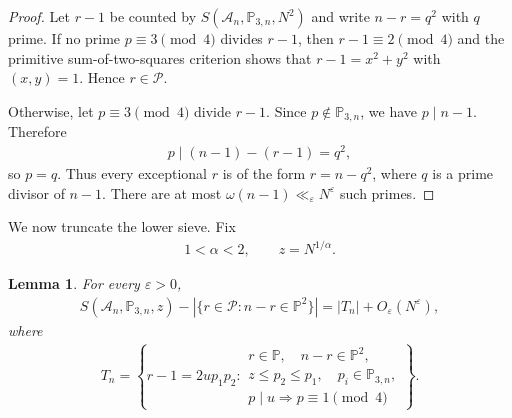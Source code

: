\documentclass[12pt,reqno]{amsart}
\numberwithin{equation}{section}
\newtheorem{lemma}[equation]{Lemma}
\theoremstyle{definition}
\theoremstyle{remark}
\begin{document}
\begin{proof}
Let $r-1$ be counted by $S(\mathcal A_n,\mathbb P_{3,n},N^2)$ and write
$n-r=q^2$ with $q$ prime. If no prime $p\equiv3\pmod4$ divides $r-1$,
then $r-1\equiv2\pmod4$ and the primitive sum-of-two-squares criterion
shows that $r-1=x^2+y^2$ with $(x,y)=1$. Hence $r\in\mathcal P$.

Otherwise, let $p\equiv3\pmod4$ divide $r-1$. Since $p\notin\mathbb
P_{3,n}$, we have $p\mid n-1$. Therefore
\begin{align*}
 p\mid(n-1)-(r-1)=q^2,
\end{align*}
so $p=q$. Thus every exceptional $r$ is of the form $r=n-q^2$, where
$q$ is a prime divisor of $n-1$. There are at most
$\omega(n-1)\ll_\varepsilon N^\varepsilon$ such primes.
\end{proof}
We now truncate the lower sieve. Fix
\begin{align}\label{e:alpharange}
 1<\alpha<2,\qquad z=N^{1/\alpha}.
\end{align}

\begin{lemma}\label{l:truncationT}
For every \(\varepsilon>0\),
\begin{align}\label{e:truncationT}
 S(\mathcal A_n,\mathbb P_{3,n},z)
 -
 |\{r\in\mathcal P:n-r\in\mathbb P^2\}|
 =
 |T_n|+O_\varepsilon(N^\varepsilon),
\end{align}
where
\begin{align}\label{e:Tfactorization}
    T_n=
 \left\{
 r-1=2up_1p_2:
 \begin{array}{l}
 r\in\mathbb P,\quad n-r\in\mathbb P^2,\\
 z\leq p_2\leq p_1,\quad p_i\in\mathbb P_{3,n},\\
 p\mid u\Longrightarrow p\equiv1\pmod4
 \end{array}
 \right\}.
\end{align}
\end{lemma}
\end{document}
